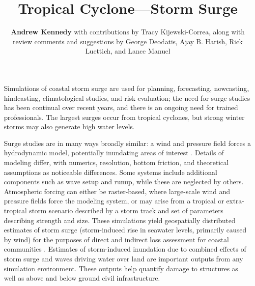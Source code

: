 %
%
%

\title{Tropical Cyclone---Storm Surge}
\author{
    \textbf{Andrew Kennedy}
    with contributions by Tracy Kijewski-Correa,
    \newline
    along with review comments and suggestions by George Deodatis, Ajay B. Harish, Rick Luettich, and Lance Manuel
}
\tocauthor{}
%
%
\maketitle
\label{chapter:haz_surge}

Simulations of coastal storm surge are used for planning, forecasting, nowcasting, hindcasting, climatological studies, and risk evaluation; the need for surge studies has been continual over recent years, and there is an ongoing need for trained professionals. The largest surges occur from tropical cyclones, but strong winter storms may also generate high water levels.

Surge studies are in many ways broadly similar: a wind and pressure field forces a hydrodynamic model, potentially inundating areas of interest \citep{njcoast2018implementation}. Details of modeling differ, with numerics, resolution, bottom friction, and theoretical assumptions as noticeable differences. Some systems include additional components such as wave setup and runup, while these are neglected by others. Atmospheric forcing can either be raster-based, where large-scale wind and pressure fields force the modeling system, or may arise from a tropical or extra-tropical storm scenario described by a storm track and set of parameters describing strength and size. These simulations yield geospatially distributed estimates of storm surge (storm-induced rise in seawater levels, primarily caused by wind) for the purposes of direct and indirect loss assessment for coastal communities \citep{jacob2011responding}. Estimates of storm-induced inundation due to combined effects of storm surge and waves driving water over land are important outputs from any simulation environment. These outputs help quantify damage to structures as well as above and below ground civil infrastructure.

